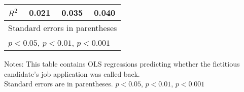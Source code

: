 \begin{table}[htbp]
\begin{tabular*}{\hsize}{@{\hskip\tabcolsep\extracolsep\fill}l*{3}{c}}
\(R^{2}\)           &       0.021         &       0.035         &       0.040         \\
\hline\hline
\multicolumn{4}{l}{\footnotesize Standard errors in parentheses}\\
\multicolumn{4}{l}{\footnotesize \sym{*} \(p<0.05\), \sym{**} \(p<0.01\), \sym{***} \(p<0.001\)}\\
\end{tabular*}
{\parbox{4.8in}{\footnotesize Notes: This table contains OLS regressions predicting whether the fictitious candidate's job application was called back. \\Standard errors are in parentheses. \sym{*} \(p<0.05\), \sym{**} \(p<0.01\), \sym{***} \(p<0.001\)
}}

\end{table}
